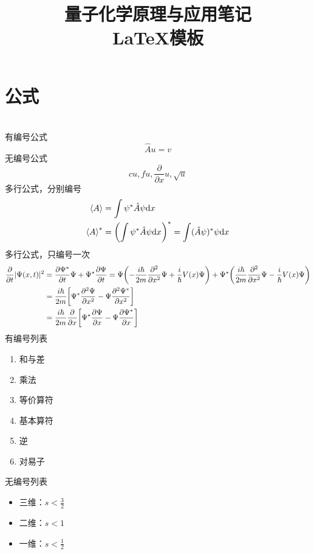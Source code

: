 \documentclass[11pt,a4paper,onecolumn]{article}
\begin{document}


\title{%
  \heiti \huge \vspace{-50pt} 量子化学原理与应用笔记 \\ \LaTeX 模板}

  \maketitle
\vspace{-10pt}



\section{公式}

~\\
有编号公式
\begin{equation}
  \hat A u = v
\end{equation}
无编号公式
\begin{equation*}
  c u, f u, \frac{\partial}{\partial x} u, \sqrt{u}
\end{equation*}
多行公式，分别编号
\begin{align}
\ev{A} &= \int \psi^* \hat A \psi \dd x \\
\ev{A}^* &= \qty(\int \psi^* \hat A \psi \dd x )^* = \int (\hat A \psi)^* \psi \dd x
\end{align}
多行公式，只编号一次
\begin{align}
\pdv{t} |\Psi(x,t)|^2  &= \pdv{\Psi^*}{t}\Psi + \Psi^*\pdv{\Psi}{t}  
= \Psi \qty(-\dfrac{i\hbar}{2m} \pdv[2]{x} \Psi + \dfrac{i}{\hbar} V(x) \Psi) + \Psi^* \qty(\dfrac{i\hbar}{2m} \pdv[2]{x} \Psi - \dfrac{i}{\hbar} V(x) \Psi) \notag\\
&= \dfrac{i\hbar}{2m} \qty[\Psi^*\pdv[2]{\Psi}{x} - \Psi\pdv[2]{\Psi^*}{x}] \notag\\
&= \dfrac{i\hbar}{2m} \pdv{x} \qty[\Psi^*\pdv{\Psi}{x} - \Psi\pdv{\Psi^*}{x}]
\end{align}
有编号列表
\begin{enumerate}[nosep]
	\item 和与差
	\item 乘法
	\item 等价算符
	\item 基本算符
	\item 逆
	\item 对易子
\end{enumerate}
无编号列表
	\begin{itemize}[nosep]
	\item 三维：$ s < \frac{3}{2} $
	\item  二维：$ s < 1 $
	\item  一维：$ s < \frac{1}{2} $
\end{itemize}
\end{document}
